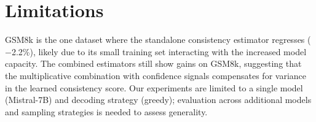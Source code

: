 \section*{Limitations}

GSM8k is the one dataset where the standalone consistency estimator regresses ($-$2.2\%), likely due to its small training set interacting with the increased model capacity.
The combined estimators still show gains on GSM8k, suggesting that the multiplicative combination with confidence signals compensates for variance in the learned consistency score.
Our experiments are limited to a single model (Mistral-7B) and decoding strategy (greedy); evaluation across additional models and sampling strategies is needed to assess generality.

